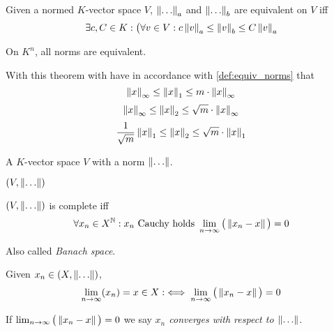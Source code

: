 \begin{definition}\label{def:equiv_norms}
   Given a normed \(K\)-vector space \(V\), \(\left\lVert\ldots\right\rVert_a\) and \(\left\lVert\ldots\right\rVert_b\) are equivalent on \(V\) iff
   \[\exists c, C \in K: \big(\forall v \in V: c \left\lVert v\right\rVert_a \leq \left\lVert v\right\rVert_b \leq C \left\lVert v\right\rVert_a\]
\end{definition}

\begin{theorem}
   On \(K^n\), all norms are equivalent.
\end{theorem}
\begin{remark}[Tips]
   With this theorem with have in accordance with \cref{def:equiv_norms} that
   \[\left\lVert x\right\rVert_\infty \leq \left\lVert x\right\rVert_1 \leq m \cdot \left\lVert x\right\rVert_\infty\]
   \[\left\lVert x\right\rVert_\infty \leq \left\lVert x\right\rVert_2 \leq \sqrt{m} \cdot \left\lVert x\right\rVert_\infty\]
   \[\frac{1}{\sqrt{m}}\left\lVert x\right\rVert_1 \leq \left\lVert x\right\rVert_2 \leq \sqrt{m} \cdot \left\lVert x\right\rVert_1\]
\end{remark}

\begin{definition}
   A \(K\)-vector space \(V\) with a norm \(\left\lVert\ldots\right\rVert\).
\end{definition}
\begin{remark}[Notation]
   \((V, \left\lVert\ldots\right\rVert)\)
\end{remark}

\begin{definition}
   \((V, \left\lVert\ldots\right\rVert)\) is complete iff
   \[\forall x_n \in X^\mathbb{N}: x_n~\text{Cauchy}~\text{holds}~\lim_{n\to\infty}\big(\left\lVert x_n - x\right\rVert\big) = 0\]
\end{definition}
\begin{remark}[Terminology]
   Also called \emph{Banach space}.
\end{remark}

\begin{definition}
   Given \(x_n \in (X, \left\lVert\ldots\right\rVert)\),
   \[\lim_{n \to \infty}(x_n) = x \in X :\iff \lim_{n \to \infty}\big(\left\lVert x_n - x\right\rVert\big) = 0\]
\end{definition}
\begin{remark}[Terminology]
   If \(\lim_{n \to \infty}\big(\left\lVert x_n - x\right\rVert\big) = 0\) we say \emph{\(x_n\) converges with respect to \(\left\lVert\ldots\right\rVert\)}.
\end{remark}

